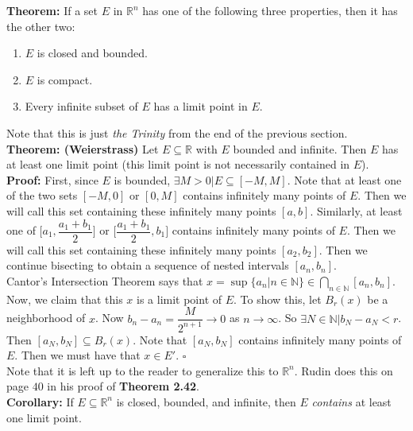 \documentclass{article}
\begin{document}
\textbf{Theorem:} If a set $E$ in $\mathbb{R}^n$ has one of the following three properties, then it has the other two:
\begin{enumerate}
    \item $E$ is closed and bounded.
    \item $E$ is compact.
    \item Every infinite subset of $E$ has a limit point in $E$.
\end{enumerate}

Note that this is just \textit{the Trinity} from the end of the previous section.\\

\textbf{Theorem: (Weierstrass)} Let $E \subseteq \mathbb{R}$ with $E$ bounded and infinite. Then $E$ has at least one limit point (this limit point is not necessarily contained in $E$).\\

\textbf{Proof:} First, since $E$ is bounded, $\exists M>0 \big| E \subseteq [-M,M]$. Note that at least one of the two sets $[-M,0]$ or $[0,M]$ contains infinitely many points of $E$. Then we will call this set containing these infinitely many points $[a,b]$. Similarly, at least one of $\biggl[a_1, \dfrac{a_1+b_1}{2} \biggr]$ or $\biggl[ \dfrac{a_1+b_1}{2}, b_1 \biggr]$ contains infinitely many points of $E$. Then we will call this set containing these infinitely many points $[a_2,b_2]$. Then we continue bisecting to obtain a sequence of nested intervals $[a_n,b_n]$. \\

Cantor's Intersection Theorem says that $x = \sup{\{a_n \big| n \in \mathbb{N}\}} \in \bigcap_{n \in \mathbb{N}} [a_n,b_n]$.\\

Now, we claim that this $x$ is a limit point of $E$. To show this, let $B_r(x)$ be a neighborhood of $x$. Now $b_n-a_n = \dfrac{M}{2^{n+1}} \longrightarrow 0$ as $n \longrightarrow \infty$. So $\exists N \in \mathbb{N} \big| b_N-a_N<r$. Then $[a_N,b_N] \subseteq B_r(x)$. Note that $[a_N,b_N]$ contains infinitely many points of $E$. Then we must have that $x \in E'$. $\square$\\

Note that it is left up to the reader to generalize this to $\mathbb{R}^n$. Rudin does this on page $40$ in his proof of \textbf{Theorem 2.42}. \\

\textbf{Corollary:} If $E \subseteq \mathbb{R}^n$ is closed, bounded, and infinite, then $E$ \textit{contains} at least one limit point.\\
\end{document}
